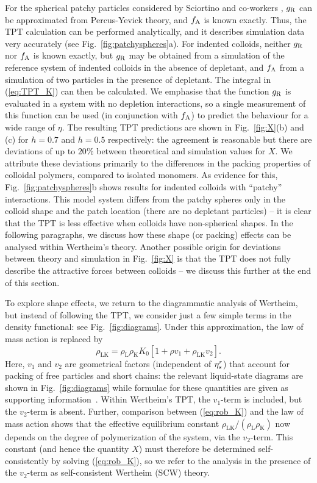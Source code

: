 \documentclass[10pt,onside,singlecolumn]{article}
\newcommand{\rhoL}{\rho_\mathrm{L}}
\newcommand{\rhoK}{\rho_\mathrm{K}}
\newcommand{\rhoLK}{\rho_\mathrm{LK}}
\begin{document}
For the spherical patchy particles considered by Sciortino and
co-workers \cite{Sciortino2007}, $g_{\rm R}$ can be approximated from
Percus-Yevick theory, and $f_{\rm A}$ is known exactly.  
Thus, the
TPT calculation can be performed analytically, and
it describes simulation data very accurately (see Fig.~\ref{fig:patchyspheres}a).
%
For indented colloids, neither $g_{\rm R}$ nor $f_{\rm A}$ is known
exactly, but $g_{\rm R}$ may be obtained from a simulation of
the reference system of indented colloids in the absence of depletant,
and $f_{\rm A}$ from a simulation of two particles in the presence of
depletant.  The integral in (\ref{eq:TPT_K}) can then be
calculated. 
%
We emphasise that the function $g_{\rm R}$ is evaluated in a system with no depletion interactions, so a single 
measurement of this function can be used (in conjunction with $f_{\rm A}$) to predict the behaviour for a wide range of $\eta$.
%
The resulting TPT predictions are shown in
Fig.~\ref{fig:X}(b) and (c) for $h=0.7$ and $h=0.5$ respectively: the agreement is reasonable but there are
deviations of up to $20\%$ between theoretical and simulation values for $X$.  
%
We attribute these deviations primarily to the differences in the packing properties 
of colloidal polymers, compared to isolated monomers.  As evidence for this, Fig.~\ref{fig:patchyspheres}b shows
results for indented colloids with ``patchy'' interactions.  This model system
differs from the patchy spheres only in the colloid shape and the patch location (there are no depletant particles)
-- it is clear that the TPT is less effective when colloids have non-spherical shapes. 
In the following paragraphs, we discuss how these shape (or packing) effects can be analysed within Wertheim's theory.  
 Another possible origin for deviations between theory and simulation 
in Fig.~\ref{fig:X} 
is that the TPT does not fully describe the attractive forces between colloids -- we discuss
this further at the end of this section.


To explore shape effects, we return to the diagrammatic analysis of Wertheim, but
instead of following the TPT, we consider
just a few simple terms in the density functional: see
Fig.~\ref{fig:diagrams}.  
%
Under this approximation, the law of mass
action is replaced by
%
\begin{equation}
\rhoLK = \rhoL \rhoK K_0 [ 1 + \rho v_1 + \rhoLK v_2 ]  .
\label{eq:rob_K}
\end{equation}
Here, $v_1$ and $v_2$ are geometrical factors (independent of $\eta_s^r$) that account for packing
of free particles and short chains: the relevant liquid-state diagrams are shown in Fig.~\ref{fig:diagrams} while 
formulae for these quantities are given as supporting information~\cite{SI}.
Within Wertheim's TPT, the $v_1$-term is included, but the $v_2$-term is absent.  
Further, comparison between (\ref{eq:rob_K}) and the law of mass action shows that the effective equilibrium
constant $\rhoLK/(\rhoL\rhoK)$ now depends on the degree of polymerization of the system, via the $v_2$-term.  
This constant (and hence the quantity $X$) must therefore be determined
self-consistently by solving (\ref{eq:rob_K}), so we refer to the analysis in the presence of the $v_2$-term as self-consistent Wertheim (SCW) theory.
\end{document}
